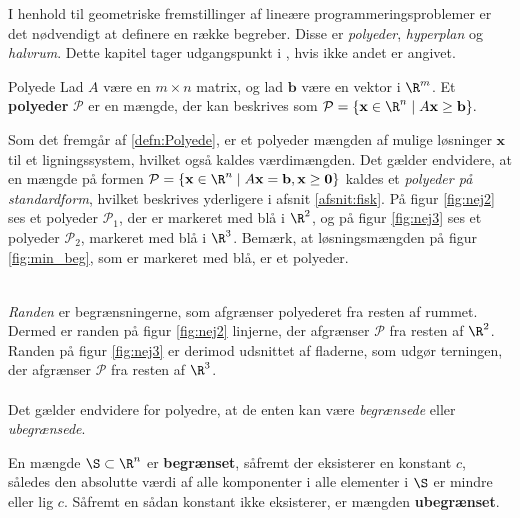 I henhold til geometriske fremstillinger af lineære programmeringsproblemer er det nødvendigt at definere en række begreber.
Disse er \textit{polyeder}, \textit{hyperplan} og \textit{halvrum}.
Dette kapitel tager udgangspunkt i \citep[side 42-70]{bert}, hvis ikke andet er angivet.
%
\begin{defn}{}{Polyede}
Lad $A$ være en $m \times n$ matrix, og lad $\mathbf{b}$ være en vektor i  $\R^m$.
Et \textbf{polyeder} $\mathcal{P}$ er en mængde, der kan beskrives som 
$\mathcal{P} = \{\textbf{x} \in \R^n \mid A\mathbf{x}\geq \textbf{b}\}.$
%
\end{defn}
\noindent
%
Som det fremgår af \ref{defn:Polyede}, er et polyeder mængden af mulige løsninger $\mathbf{x}$ til et ligningssystem, hvilket også kaldes værdimængden.
Det gælder endvidere, at en mængde på formen $\mathcal{P} = \{\textbf{x} \in \R^n \mid A\textbf{x} = \textbf{b},\textbf{x} \geq \textbf{0} \}$ kaldes et \textit{polyeder på standardform}, hvilket beskrives yderligere i afsnit \ref{afsnit:fisk}.
%
%
På figur \ref{fig:nej2} ses et polyeder $\mathcal{P}_1$, der er markeret med blå i $\R^2$, og på figur \ref{fig:nej3} ses et polyeder $\mathcal{P}_2$, markeret med blå i $\R^3$.
Bemærk, at løsningsmængden på figur \ref{fig:min_beg}, som er markeret med blå, er et polyeder.
%
%
\begin{center}
$
\begin{array}{cc}
&

\end{array}
$
\end{center}
%
\textit{Randen} er begrænsningerne, som afgrænser polyederet fra resten af rummet. 
Dermed er randen på figur \ref{fig:nej2} linjerne, der afgrænser $\mathcal{P}$ fra resten af $\R^2$.
Randen på figur \ref{fig:nej3} er derimod udsnittet af fladerne, som udgør terningen, der afgrænser $\mathcal{P}$ fra resten af $\R^3$.
\\\\
%
Det gælder endvidere for polyedre, at de enten kan være \textit{begrænsede} eller \textit{ubegrænsede}.
%
\begin{defn}{}{}
En mængde $\S \subset \R^n$ er \textbf{begrænset}, såfremt der eksisterer en konstant $c$, således den absolutte værdi af alle komponenter i alle elementer i $\S$ er mindre eller lig $c$. 
Såfremt en sådan konstant ikke eksisterer, er mængden \textbf{ubegrænset}.
\end{defn}
